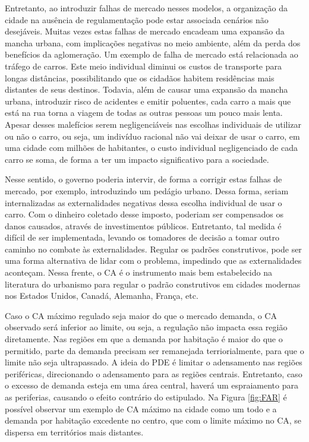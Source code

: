 Entretanto, ao introduzir falhas de mercado nesses modelos, a organização da cidade na ausência de regulamentação pode estar associada cenários não desejáveis. Muitas vezes estas falhas de mercado encadeam uma expansão da mancha urbana, com implicações negativas no meio ambiente, além da perda dos benefícios da aglomeração. Um exemplo de falha de mercado está relacionada ao tráfego de carros. Este meio individual diminui os custos de transporte para longas distâncias, possibilitando que os cidadãos habitem residências mais distantes de seus destinos. Todavia, além de causar uma expansão da mancha urbana, introduzir risco de acidentes e emitir poluentes, cada carro a mais que está na rua torna a viagem de todas as outras pessoas um pouco mais lenta. Apesar desses malefícios serem negligenciáveis nas escolhas individuais de utilizar ou não o carro, ou seja, um indivíduo racional não vai deixar de usar o carro, em uma cidade com milhões de habitantes, o custo individual negligenciado de cada carro se soma, de forma a ter um impacto significativo para a sociedade.

Nesse sentido, o governo poderia intervir, de forma a corrigir estas falhas de mercado, por exemplo, introduzindo um pedágio urbano. Dessa forma, seriam internalizadas as externalidades negativas dessa escolha individual de usar o carro. Com o dinheiro coletado desse imposto, poderiam ser compensados os danos causados, através de investimentos públicos. Entretanto, tal medida é difícil de ser implementada, levando os tomadores de decisão a tomar outro caminho no combate às externalidades. Regular os padrões construtivos, pode ser uma forma alternativa de lidar com o problema, impedindo que as externalidades aconteçam. Nessa frente, o CA é o instrumento mais bem estabelecido na literatura do urbanismo para regular o padrão construtivos em cidades modernas nos Estados Unidos, Canadá, Alemanha, França, etc.

Caso o CA máximo regulado seja maior do que o mercado demanda, o CA observado será inferior ao limite, ou seja, a regulação não impacta essa região diretamente. Nas regiões em que a demanda por habitação é maior do que o permitido, parte da demanda precisam ser remanejada terriorialmente, para que o limite não seja ultrapassado. A ideia do PDE é limitar o adensamento nas regiões periféricas, direcionando o adensamento para as regiões centrais. Entretanto, caso o excesso de demanda esteja em uma área central, haverá um espraiamento para as periferias, causando o efeito contrário do estipulado. Na Figura \ref{fig:FAR} é possível observar um exemplo de CA máximo na cidade como um todo e a demanda por habitação excedente no centro, que com o limite máximo no CA, se dispersa em territórios mais distantes.

